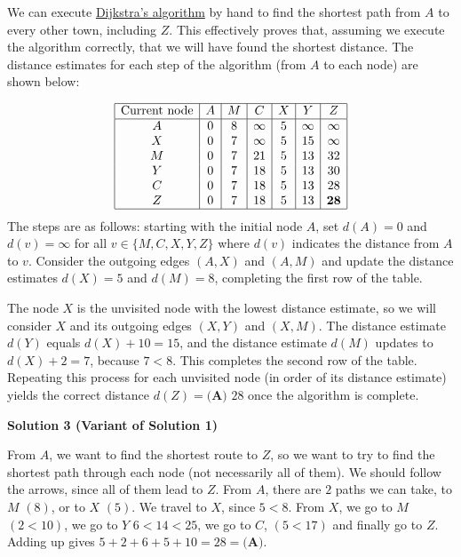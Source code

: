 \begin{enumerate}
We can execute \href{https://en.wikipedia.org/wiki/Dijkstra\%27s\_algorithm}{Dijkstra's algorithm} by hand to find the shortest path from $A$ to every other town, including $Z$. This effectively proves that, assuming we execute the algorithm correctly, that we will have found the shortest distance. The distance estimates for each step of the algorithm (from $A$ to each node) are shown below:

 
 \[\begin{array}{|c|c|c|c|c|c|c|} \hline \text{Current node} & A & M & C & X & Y & Z \\ \hline A & 0 & 8 & \infty & 5 & \infty & \infty \\ X & 0 & 7 & \infty & 5 & 15 & \infty \\ M & 0 & 7 & 21 & 5 & 13 & 32 \\ Y & 0 & 7 & 18 & 5 & 13 & 30 \\ C & 0 & 7 & 18 & 5 & 13 & 28 \\ Z & 0 & 7 & 18 & 5 & 13 & \textbf{28} \\ \hline \end{array}\]The steps are as follows: starting with the initial node $A$, set $d(A)=0$ and $d(v)=\infty$ for all $v \in \{M,C,X,Y,Z\}$ where $d(v)$ indicates the distance from $A$ to $v$. Consider the outgoing edges $(A,X)$ and $(A,M)$ and update the distance estimates $d(X)=5$ and $d(M)=8$, completing the first row of the table.

 The node $X$ is the unvisited node with the lowest distance estimate, so we will consider $X$ and its outgoing edges $(X,Y)$ and $(X,M)$. The distance estimate $d(Y)$ equals $d(X)+10=15$, and the distance estimate $d(M)$ updates to $d(X)+2=7$, because $7 < 8$. This completes the second row of the table. Repeating this process for each unvisited node (in order of its distance estimate) yields the correct distance $d(Z) = \boxed{\textbf{(A) } 28}$ once the algorithm is complete.

 


 



\textbf{Solution 3 (Variant of Solution 1)}

From $A$, we want to find the shortest route to $Z$, so we want to try to find the shortest path through each node (not necessarily all of them). We should follow the arrows, since all of them lead to $Z$. From $A$, there are $2$ paths we can take, to $M$ $(8)$, or to $X$ $(5)$. We travel to $X$, since $5 < 8$. From $X$, we go to $M$ $(2 < 10)$, we go to $Y$ $6 < 14 < 25$, we go to $C$, $(5 < 17)$ and finally go to $Z$. Adding up gives $5 + 2 + 6 + 5 + 10 = 28 = \boxed{\textbf{(A)}}$.


\end{enumerate}
